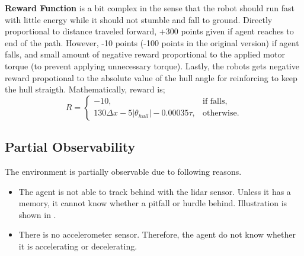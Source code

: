 \textbf{Reward Function} is a bit complex in the sense that the robot should run fast with little energy while it should not stumble and fall to ground. 
Directly proportional to distance traveled forward, +300 points given if agent reaches to end of the path. 
However, -10 points (-100 points in the original version) if agent falls, 
and small amount of negative reward proportional to the applied motor torque (to prevent applying unnecessary torque). 
Lastly, the robots gets negative reward propotional to the absolute value of the hull angle for reinforcing to keep the hull straigth. 
Mathematically, reward is;
\begin{equation}
\label{eqn:reward_fcn}
R = 
\begin{cases}
-10,   & \text{if falls} ,\\
130 \Delta x -5 |\theta_{hull}| - 0.00035 \tau,   & \text{otherwise}.
\end{cases}
\end{equation}

\subsection{Partial Observability}

The environment is partially observable due to following reasons.
\begin{itemize}
	\item The agent is not able to track behind with the lidar sensor. 
	Unless it has a memory, it cannot know whether a pitfall or hurdle behind. 
	Illustration is shown in .
	\item There is no accelerometer sensor. 
	Therefore, the agent do not know whether it is accelerating or decelerating.
\end{itemize}


